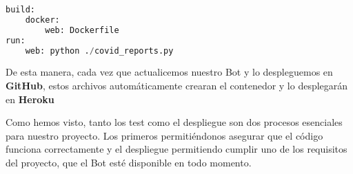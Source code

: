 \begin{lstlisting}[language=Python, caption={Archivo heroku.yml.}, label={lst:heroku}]
build:
	docker:
		web: Dockerfile
run:
	web: python ./covid_reports.py
\end{lstlisting}

De esta manera, cada vez que actualicemos nuestro Bot y lo despleguemos en \textbf{GitHub}, estos archivos automáticamente crearan el contenedor y lo desplegarán en \textbf{Heroku}

Como hemos visto, tanto los test como el despliegue son dos procesos esenciales para nuestro proyecto. Los primeros permitiéndonos asegurar que el código funciona correctamente y el despliegue permitiendo cumplir uno de los requisitos del proyecto, que el Bot esté disponible en todo momento.